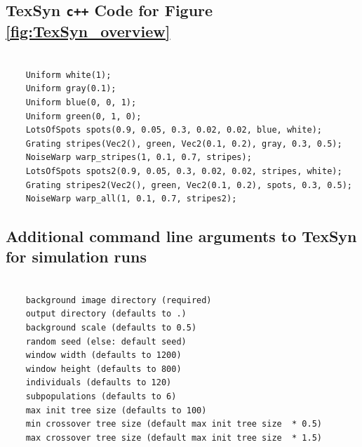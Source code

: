 \documentclass[letterpaper]{article}
\newcommand{\texsyn}[0]{TexSyn}
\begin{document}
\subsection{\texsyn{} \texttt{c++} Code for Figure \ref{fig:TexSyn_overview}}
\label{sec:cpp_code}
\begin{minipage}{\linewidth}
\begin{small}
\begin{verbatim}

    Uniform white(1);
    Uniform gray(0.1);
    Uniform blue(0, 0, 1);
    Uniform green(0, 1, 0);
    LotsOfSpots spots(0.9, 0.05, 0.3, 0.02, 0.02, blue, white);
    Grating stripes(Vec2(), green, Vec2(0.1, 0.2), gray, 0.3, 0.5);
    NoiseWarp warp_stripes(1, 0.1, 0.7, stripes);
    LotsOfSpots spots2(0.9, 0.05, 0.3, 0.02, 0.02, stripes, white);
    Grating stripes2(Vec2(), green, Vec2(0.1, 0.2), spots, 0.3, 0.5);
    NoiseWarp warp_all(1, 0.1, 0.7, stripes2);

\end{verbatim}
\end{small}
\end{minipage}

\subsection{Additional command line arguments to \texsyn{} for simulation runs}
\label{sec:texsyn_cmd_line_args}
\begin{minipage}{\linewidth}
\begin{small}
\begin{verbatim}

    background image directory (required)
    output directory (defaults to .)
    background scale (defaults to 0.5)
    random seed (else: default seed)
    window width (defaults to 1200)
    window height (defaults to 800)
    individuals (defaults to 120)
    subpopulations (defaults to 6)
    max init tree size (defaults to 100)
    min crossover tree size (default max init tree size  * 0.5)
    max crossover tree size (default max init tree size  * 1.5)
\end{verbatim}
\end{small}
\end{minipage}

\newpage
\end{document}
